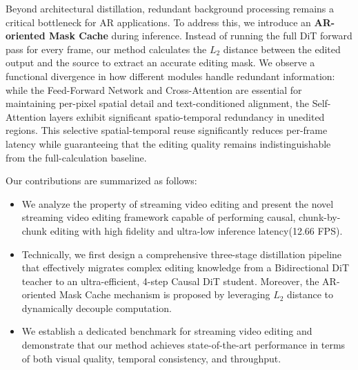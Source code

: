 Beyond architectural distillation, redundant background processing remains a critical bottleneck for AR applications. To address this, we introduce an \textbf{AR-oriented Mask Cache} during inference. Instead of running the full DiT forward pass for every frame, our method calculates the $L_2$ distance between the edited output and the source to extract an accurate editing mask. We observe a functional divergence in how different modules handle redundant information: while the Feed-Forward Network and Cross-Attention are essential for maintaining per-pixel spatial detail and text-conditioned alignment, the Self-Attention layers exhibit significant spatio-temporal redundancy in unedited regions. This selective spatial-temporal reuse significantly reduces per-frame latency while guaranteeing that the editing quality remains indistinguishable from the full-calculation baseline.


Our contributions are summarized as follows:

\begin{itemize}

\item We analyze the property of streaming video editing and present the novel streaming video editing framework capable of performing causal, chunk-by-chunk editing with high fidelity and ultra-low inference latency(12.66 FPS).



\item Technically, we first design a comprehensive three-stage distillation pipeline that effectively migrates complex editing knowledge from a Bidirectional DiT teacher to an ultra-efficient, 4-step Causal DiT student. Moreover,  the AR-oriented Mask Cache mechanism is proposed by leveraging $L_2$ distance to dynamically decouple computation.


\item We establish a dedicated benchmark for streaming video editing and demonstrate that our method achieves state-of-the-art performance in terms of both visual quality, temporal consistency, and throughput.

\end{itemize}

